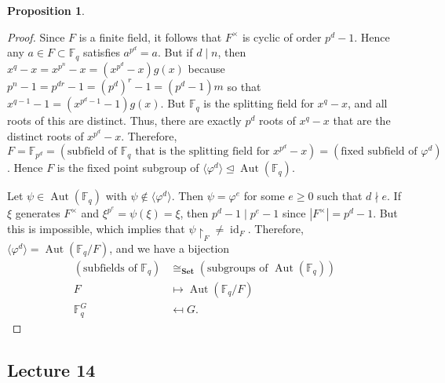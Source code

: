 \documentclass[10pt,letterpaper,cm]{nupset}
\theoremstyle{definition}
\theoremstyle{theorem}
\newtheorem{prop}[definition]{Proposition}
\theoremstyle{remark}
\newcommand{\F}{\mathbb F}
\newcommand{\1}{\mathbf{1}}
\newcommand{\0}{\vec 0}
\DeclareMathOperator{\id}{id}
\DeclareMathOperator{\aut}{Aut}
\begin{document}
\begin{prop}
\begin{enumerate}
\begin{proof}
 Since $F$ is a finite field, it follows that $F^{\times}$ is cyclic of order $p^d -1$. Hence any $a\in F\subset \F_q$ satisfies $a^{p^d} =a$. But if $ d\mid n$, then $x^q -x = x^{p^n} -x = (x^{p^d} -x)g(x)$ because $p^n -1 = p^{dr}-1 = (p^d)^r -1 = (p^d -1)m$ so that $x^{q-1}-1 = (x^{p^d -1} -1) g(x)$. But $\F_q$ is the splitting field for $x^q-x$, and all roots of this are distinct. Thus, there are exactly $p^d$ roots of $x^q-x$ that are the distinct roots of $x^{p^d}-x$. Therefore, $F = \F_{p^d} = (\text{subfield of } \F_q \text{ that is the splitting field for } x^{p^d} -x)= (\text{fixed subfield of } \varphi^d)$ . Hence $F$ is the fixed point subgroup of $\langle \varphi^d\rangle \unlhd \aut(\F_q)$.

\medskip

	Let $\psi \in \aut(\F_q)$ with $\psi \notin \langle \varphi^d \rangle$. Then $\psi =\varphi^e$ for some $e\geq 0$ such that $d \nmid e$. If $\xi$ generates $F^{\times}$ and $\xi^{p^e} =\psi(\xi) = \xi$, then $p^d -1 \mid p^e-1$ since $|F^{\times}|=p^d-1$. But this is impossible, which implies that $\psi\restriction_F \ne \id_F$. Therefore, $\langle \varphi^d \rangle =\aut(\F_q/F)$, and we have a bijection 
\begin{align*}
(\text{subfields of } \F_q) & \cong_{\mathbf{Set}} (\text{subgroups of } \aut(\F_q))
\\ F & \mapsto \aut(\F_q/F)
\\  \F_q^G & \mapsfrom G.
\end{align*}
\end{proof}
\end{enumerate}
\end{prop} 

\subsection{Lecture 14}
\end{document}
